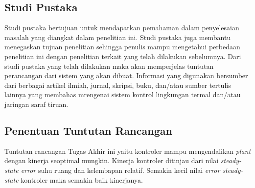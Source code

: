 

\subsection{Studi Pustaka}
Studi pustaka bertujuan untuk mendapatkan pemahaman dalam penyelesaian masalah yang diangkat dalam penelitian ini. Studi pustaka juga membantu menegaskan tujuan penelitian sehingga penulis mampu mengetahui perbedaan penelitian ini dengan penelitian terkait yang telah dilakukan sebelumnya. Dari studi pustaka yang telah dilakukan maka akan memperjelas tuntutan perancangan dari sistem yang akan dibuat. Informasi yang digunakan bersumber dari berbagai artikel ilmiah, jurnal, skripsi, buku, dan/atau sumber tertulis lainnya yang membahas mrengenai sistem kontrol lingkungan termal dan/atau jaringan saraf tiruan.

\subsection{Penentuan Tuntutan Rancangan}

Tuntutan rancangan Tugas Akhir ini yaitu kontroler mampu mengendalikan \textit{plant} dengan kinerja seoptimal mungkin. Kinerja kontroler ditinjau dari nilai \textit{steady-state error} suhu ruang dan kelembapan relatif. Semakin kecil nilai \textit{error steady-state} kontroler maka semakin baik kinerjanya.

